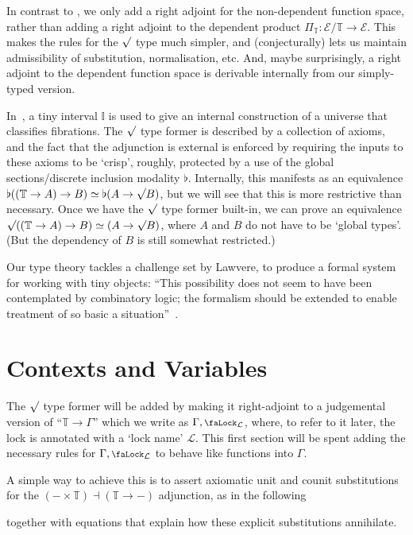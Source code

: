\documentclass[10pt]{article}
\theoremstyle{definition}
\renewcommand{\equiv}{\simeq}
\newcommand{\yields}{\vdash}
\newcommand{\ctx}{\,\,\mathsf{ctx}}
\newcommand{\type}{\,\,\mathsf{type}}
\newcommand{\lock}{\mathchoice {\scalebox{0.8}{\text{\faLock}}}
  {\scalebox{0.8}{\text{\faLock}}} {\scalebox{0.5}{\text{\faLock}}}
  {\scalebox{0.4}{\text{\faLock}}} }
\newcommand{\Tiny}{\mathbb{T}}
\newcommand{\lockn}[1]{\mathcal{#1}}
\newcommand{\ctxlocke}[1]{\lock_{#1}}
\newcommand{\ctxlock}[1]{\ctxlocke{\lockn{#1}}}
\newcommand{\unit}[3]{\mathsf{unit}_{#1, #2, \lockn{#3}}}
\newcommand{\counit}[3]{\mathsf{counit}_{#1, \lockn{#2}, #3}}
\newcommand{\rformsym}{\surd}
\newcommand{\rformu}[1]{\ThisStyle{\raisebox{0.07em}{$\SavedStyle \rformsym$}} #1}
\begin{document}
In contrast to \cite[Section 2]{transpension}, we only add a right
adjoint for the non-dependent function space, rather than adding a
right adjoint to the dependent product
$\Pi_\Tiny : \mathcal{E}/\Tiny \to \mathcal{E}$. This makes the rules
for the $\rformu$ type much simpler, and (conjecturally) lets us
maintain admissibility of substitution, normalisation, etc. And, maybe
surprisingly, a right adjoint to the dependent function space is
derivable internally from our simply-typed version.

In~\cite{lops}, a tiny interval $\mathbb{I}$ is used to give an
internal construction of a universe that classifies fibrations. The
$\rformu$ type former is described by a collection of axioms, and the
fact that the adjunction is external is enforced by requiring the
inputs to these axioms to be `crisp', roughly, protected by a use of
the global sections/discrete inclusion modality $\flat$. Internally,
this manifests as an equivalence
$\flat((\Tiny \to A) \to B) \equiv \flat(A \to \rformu B)$, but we
will see that this is more restrictive than necessary. Once we have
the $\rformu$ type former built-in, we can prove an equivalence
$\rformu ((\Tiny \to A) \to B) \equiv (A \to \rformu B)$, where $A$
and $B$ do not have to be `global types'. (But the dependency of $B$
is still somewhat restricted.)

Our type theory tackles a challenge set by Lawvere, to produce a
formal system for working with tiny objects: ``This possibility does
not seem to have been contemplated by combinatory logic; the formalism
should be extended to enable treatment of so basic a
situation''~\cite[Section 3]{lawvere:adjoints}.


\section{Contexts and Variables}

The $\rformu$ type former will be added by making it right-adjoint to
a judgemental version of ``$\Tiny \to \Gamma$'' which we write as
$\Gamma, \ctxlock{L}$, where, to refer to it later, the lock is
annotated with a `lock name' $\lockn{L}$. This first section will be
spent adding the necessary rules for $\Gamma, \ctxlock{L}$ to behave
like functions into $\Gamma$.

A simple way to achieve this is to assert axiomatic unit and counit
substitutions for the $(- \times \Tiny) \dashv (\Tiny \to -)$
adjunction, as in the following
together with equations that explain how these explicit substitutions
annihilate.
\end{document}
